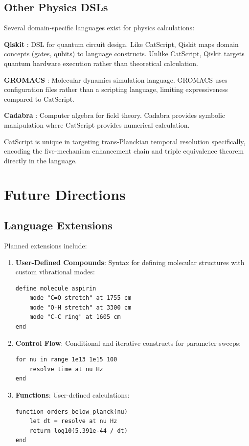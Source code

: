 \documentclass[twocolumn,10pt]{article}
\begin{document}
\subsection{Other Physics DSLs}

Several domain-specific languages exist for physics calculations:

\textbf{Qiskit} \cite{qiskit2019}: DSL for quantum circuit design. Like CatScript, Qiskit maps domain concepts (gates, qubits) to language constructs. Unlike CatScript, Qiskit targets quantum hardware execution rather than theoretical calculation.

\textbf{GROMACS} \cite{gromacs2015}: Molecular dynamics simulation language. GROMACS uses configuration files rather than a scripting language, limiting expressiveness compared to CatScript.

\textbf{Cadabra} \cite{cadabra2007}: Computer algebra for field theory. Cadabra provides symbolic manipulation where CatScript provides numerical calculation.

CatScript is unique in targeting trans-Planckian temporal resolution specifically, encoding the five-mechanism enhancement chain and triple equivalence theorem directly in the language.

\section{Future Directions}

\subsection{Language Extensions}

Planned extensions include:

\begin{enumerate}
    \item \textbf{User-Defined Compounds}: Syntax for defining molecular structures with custom vibrational modes:
    \begin{lstlisting}
define molecule aspirin
    mode "C=O stretch" at 1755 cm
    mode "O-H stretch" at 3300 cm
    mode "C-C ring" at 1605 cm
end
    \end{lstlisting}

    \item \textbf{Control Flow}: Conditional and iterative constructs for parameter sweeps:
    \begin{lstlisting}
for nu in range 1e13 1e15 100
    resolve time at nu Hz
end
    \end{lstlisting}

    \item \textbf{Functions}: User-defined calculations:
    \begin{lstlisting}
function orders_below_planck(nu)
    let dt = resolve at nu Hz
    return log10(5.391e-44 / dt)
end
    \end{lstlisting}
\end{enumerate}
\end{document}
